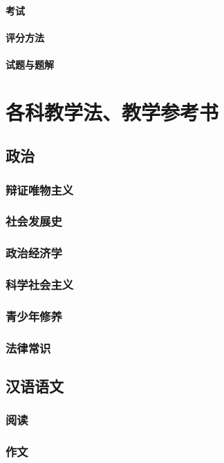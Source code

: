 \documentclass[UTF8]{../../ApplicationUniverse}
\begin{document}
            \paragraph{考试}
            \paragraph{评分方法}
            \paragraph{试题与题解}
\section{各科教学法、教学参考书}
    \subsection{政治}
        \subsubsection{辩证唯物主义}
        \subsubsection{社会发展史}
        \subsubsection{政治经济学}
        \subsubsection{科学社会主义}
        \subsubsection{青少年修养}
        \subsubsection{法律常识}
    \subsection{汉语语文}
        \subsubsection{阅读}
        \subsubsection{作文}
\end{document}
